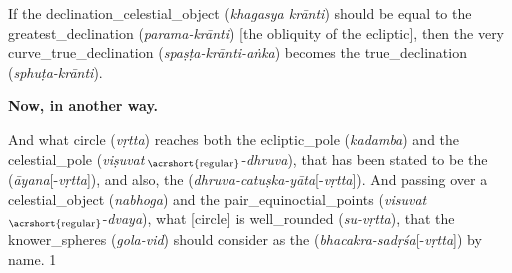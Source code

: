 \noindent\reversemarginpar{}%
If the \gls{declination_celestial_object} (\textit{khagasya krānti}) should be equal to the \gls{greatest_declination} (\textit{parama-krānti}) [\ie the obliquity of the ecliptic], then the very \gls{curve_true_declination} (\textit{spa\-ṣṭa-krānti-aṅka}) becomes the \gls{true_declination} (\textit{sphuṭa-krānti}).
\bigskip

\textbf{Now, in another way.}
\bigskip

\noindent\reversemarginpar{}%
And what \gls{circle} (\textit{vṛtta}) reaches both the \gls{ecliptic_pole} (\textit{kadamba}) and the \gls{celestial_pole} (\textit{viṣuvat}\,$_\text{\acrshort{regular}}$-\textit{dhruva}), that has been stated to be the  (\textit{āyana}[-\textit{vṛtta}]), and also, the  (\textit{dhruva-catuṣka-yāta}[-\textit{vṛtta}]). And passing over a \gls{celestial_object} (\textit{nabhoga}) and the \gls{pair_equinoctial_points} (\textit{visuvat}\,$_\text{\acrshort{regular}}$-\textit{dvaya}), what [circle] is \gls{well_rounded} (\textit{su-vṛtta}), that the \gls{knower_spheres} (\textit{gola-vid}) should consider as
the  (\textit{bhacakra-sadṛśa}[-\textit{vṛtta}]) by name. 1 
\label{verse_1_label_eng_example}


\clearpage{}

